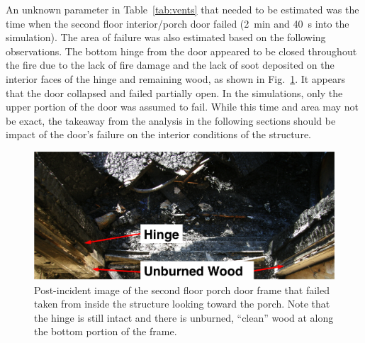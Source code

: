 \documentclass[12pt,oneside]{book}
\begin{document}
An unknown parameter in Table~\ref{tab:vents} that needed to be estimated was the time when the second floor interior/porch door failed (2~min and 40~s into the simulation). The area of failure was also estimated based on the following observations. The bottom hinge from the door appeared to be closed throughout the fire due to the lack of fire damage and the lack of soot deposited on the interior faces of the hinge and remaining wood, as shown in Fig.~\ref{fig:door_frame}. It appears that the door collapsed and failed partially open. In the simulations, only the upper portion of the door was assumed to fail. While this time and area may not be exact, the takeaway from the analysis in the following sections should be impact of the door's failure on the interior conditions of the structure.

\begin{figure}[!ht]
\centering
\includegraphics[width=.80\textwidth]{../Figures/door_frame_burn}
\caption[Post-incident image of rear porch door frame.]{Post-incident image of the second floor porch door frame that failed taken from inside the structure looking toward the porch. Note that the hinge is still intact and there is unburned, ``clean'' wood at along the bottom portion of the frame.}
\label{fig:door_frame}
\end{figure}
\end{document}
